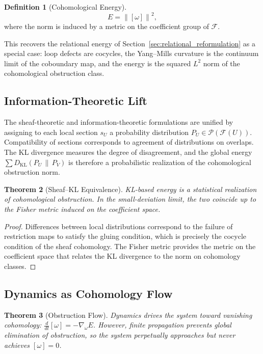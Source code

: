\documentclass[12pt,a4paper,openany]{book}
\theoremstyle{plain}
\newtheorem{theorem}{Theorem}[chapter]
\theoremstyle{definition}
\newtheorem{definition}[theorem]{Definition}
\theoremstyle{remark}
\newcommand{\norm}[1]{\left\|#1\right\|}
\begin{document}
\begin{definition}[Cohomological Energy]
\[
E = \norm{[\omega]}^2,
\]
where the norm is induced by a metric on the coefficient group of $\mathcal{F}$.
\end{definition}

This recovers the relational energy of Section~\ref{sec:relational_reformulation} as a special case: loop defects are cocycles, the Yang--Mills curvature is the continuum limit of the coboundary map, and the energy is the squared $L^2$ norm of the cohomological obstruction class.

\subsection{Information-Theoretic Lift}

The sheaf-theoretic and information-theoretic formulations are unified by assigning to each local section $s_U$ a probability distribution $P_U \in \mathcal{P}(\mathcal{F}(U))$. Compatibility of sections corresponds to agreement of distributions on overlaps. The KL divergence measures the degree of disagreement, and the global energy $\sum D_{\mathrm{KL}}(P_U \,\|\, P_V)$ is therefore a probabilistic realization of the cohomological obstruction norm.

\begin{theorem}[Sheaf--KL Equivalence]
KL-based energy is a statistical realization of cohomological obstruction. In the small-deviation limit, the two coincide up to the Fisher metric induced on the coefficient space.
\end{theorem}

\begin{proof}
Differences between local distributions correspond to the failure of restriction maps to satisfy the gluing condition, which is precisely the cocycle condition of the sheaf cohomology. The Fisher metric provides the metric on the coefficient space that relates the KL divergence to the norm on cohomology classes.
\end{proof}

\subsection{Dynamics as Cohomology Flow}

\begin{theorem}[Obstruction Flow]
Dynamics drives the system toward vanishing cohomology: $\frac{d}{dt}[\omega] = -\nabla_\omega E$. However, finite propagation prevents global elimination of obstruction, so the system perpetually approaches but never achieves $[\omega] = 0$.
\end{theorem}
\end{document}
